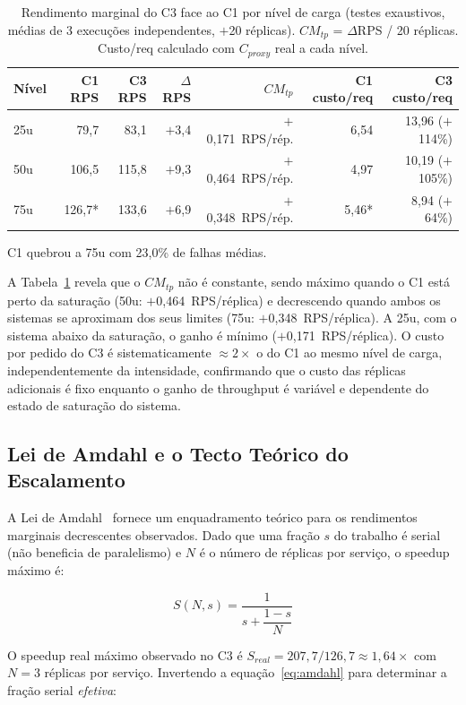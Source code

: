\documentclass[manuscript,oneside]{acmart}
\begin{document}
\begin{table}[H]
\caption{Rendimento marginal do C3 face ao C1 por nível de carga (testes exaustivos, médias de 3 execuções independentes, $+$20 réplicas). $CM_{tp}$ = $\Delta$RPS / 20 réplicas. Custo/req calculado com $C_{proxy}$ real a cada nível.}
\label{tab:marginal-nivel}
\begin{tabular}{lrrrrrr}
\toprule
\textbf{Nível} & \textbf{C1 RPS} & \textbf{C3 RPS} & \textbf{$\Delta$RPS} & \textbf{$CM_{tp}$} & \textbf{C1 custo/req} & \textbf{C3 custo/req} \\
\midrule
25u & 79,7 & 83,1 & $+$3,4 & $+$0,171~RPS/rép. & 6,54 & 13,96 ($+$114\%) \\
50u & 106,5 & 115,8 & $+$9,3 & $+$0,464~RPS/rép. & 4,97 & 10,19 ($+$105\%) \\
75u & 126,7* & 133,6 & $+$6,9 & $+$0,348~RPS/rép. & 5,46* & 8,94 ($+$64\%) \\
\bottomrule
\end{tabular}
\end{table}
{\small *C1 quebrou a 75u com 23,0\% de falhas médias.}

A Tabela~\ref{tab:marginal-nivel} revela que o $CM_{tp}$ não é constante, sendo máximo quando o C1 está perto da saturação (50u: $+$0,464~RPS/réplica) e decrescendo quando ambos os sistemas se aproximam dos seus limites (75u: $+$0,348~RPS/réplica). A 25u, com o sistema abaixo da saturação, o ganho é mínimo ($+$0,171~RPS/réplica). O custo por pedido do C3 é sistematicamente $\approx 2\times$ o do C1 ao mesmo nível de carga, independentemente da intensidade, confirmando que o custo das réplicas adicionais é fixo enquanto o ganho de throughput é variável e dependente do estado de saturação do sistema.

\subsection{Lei de Amdahl e o Tecto Teórico do Escalamento}
\label{subsec:amdahl}

A Lei de Amdahl~\cite{amdahl} fornece um enquadramento teórico para os rendimentos marginais decrescentes observados. Dado que uma fração $s$ do trabalho é serial (não beneficia de paralelismo) e $N$ é o número de réplicas por serviço, o speedup máximo é:

\begin{equation}
S(N, s) = \frac{1}{s + \dfrac{1-s}{N}}
\label{eq:amdahl}
\end{equation}

O speedup real máximo observado no C3 é $S_{real} = 207{,}7 / 126{,}7 \approx 1{,}64\times$ com $N=3$ réplicas por serviço. Invertendo a equação~\ref{eq:amdahl} para determinar a fração serial \emph{efetiva}:
\end{document}
